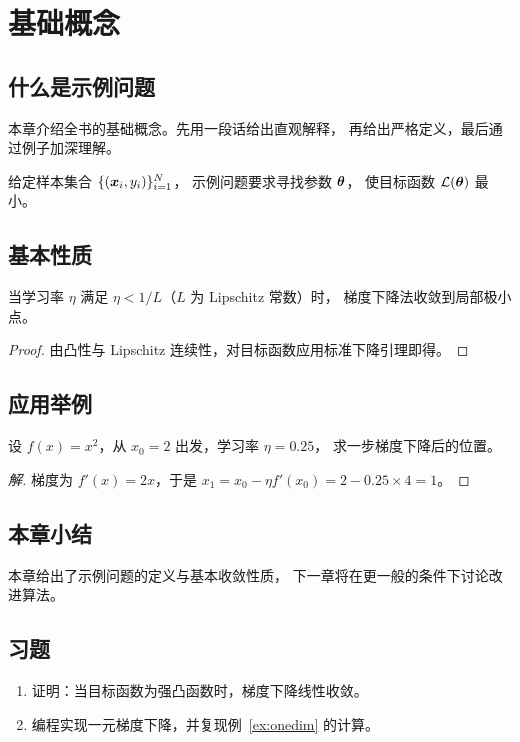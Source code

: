 \chapter{基础概念}

\section{什么是示例问题}
本章介绍全书的基础概念。先用一段话给出直观解释，
再给出严格定义，最后通过例子加深理解。

\begin{definition}[示例问题]
  给定样本集合 $\{(\boldsymbol{x}_i, y_i)\}_{i=1}^{N}$，
  示例问题要求寻找参数 $\boldsymbol{\theta}$，
  使目标函数 $\mathcal{L}(\boldsymbol{\theta})$ 最小。
\end{definition}

\section{基本性质}
\begin{theorem}[收敛性]
  当学习率 $\eta$ 满足 $\eta < 1/L$（$L$ 为 Lipschitz 常数）时，
  梯度下降法收敛到局部极小点。
\end{theorem}
\begin{proof}
  由凸性与 Lipschitz 连续性，对目标函数应用标准下降引理即得。
\end{proof}

\section{应用举例}
\begin{example}[一元情形]
  \label{ex:onedim}
  设 $f(x) = x^2$，从 $x_0 = 2$ 出发，学习率 $\eta = 0.25$，
  求一步梯度下降后的位置。
\end{example}
\begin{proof}[解]
  梯度为 $f'(x) = 2x$，于是
  $x_1 = x_0 - \eta f'(x_0) = 2 - 0.25 \times 4 = 1$。
\end{proof}

\section{本章小结}
本章给出了示例问题的定义与基本收敛性质，
下一章将在更一般的条件下讨论改进算法。

\section*{习\quad 题}
\begin{enumerate}
  \item 证明：当目标函数为强凸函数时，梯度下降线性收敛。
  \item 编程实现一元梯度下降，并复现例~\ref{ex:onedim} 的计算。
\end{enumerate}

